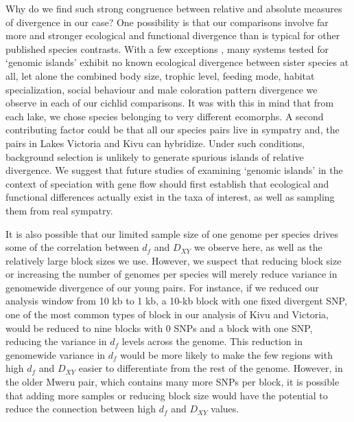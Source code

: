 Why do we find such strong congruence between relative and absolute measures of divergence in our case? One possibility is that our comparisons involve far more and stronger ecological and functional divergence than is typical for other published species contrasts. With a few exceptions \cite{estrada2002patterns, lehmann2008molecular}, many systems tested for `genomic islands' exhibit no known ecological divergence between sister species at all, let alone the combined body size, trophic level, feeding mode, habitat specialization, social behaviour and male coloration pattern divergence we observe in each of our cichlid comparisons. It was with this in mind that from each lake, we chose species belonging to very different ecomorphs. A second contributing factor could be that all our species pairs live in sympatry and, the pairs in Lakes Victoria and Kivu can hybridize. Under such conditions, background selection is unlikely to generate spurious islands of relative divergence. We suggest that future studies of examining `genomic islands' in the context of speciation with gene flow should first establish that ecological and functional differences actually exist in the taxa of interest, as well as sampling them from real sympatry.

It is also possible that our limited sample size of one genome per species drives some of the correlation between $d_f$ and $D_{XY}$ we observe here, as well as the relatively large block sizes we use. However, we suspect that reducing block size or increasing the number of genomes per species will merely reduce variance in genomewide divergence of our young pairs. For instance, if we reduced our analysis window from 10 kb to 1 kb, a 10-kb block with one fixed divergent SNP, one of the most common types of block in our analysis of Kivu and Victoria, would be reduced to nine blocks with 0 SNPs and a block with one SNP, reducing the variance in $d_f$ levels across the genome. This reduction in genomewide variance in $d_f$ would be more likely to make the few regions with high $d_f$ and $D_{XY}$ easier to differentiate from the rest of the genome. However, in the older Mweru pair, which contains many more SNPs per block, it is possible that adding more samples or reducing block size would have the potential to reduce the connection between high $d_f$ and $D_{XY}$ values.


